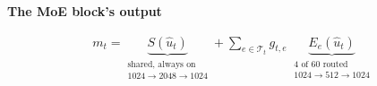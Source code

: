 \documentclass[border=40pt]{standalone}
\begin{document}
\begin{minipage}{26cm}
{\sffamily\bfseries\Large\color{muted} The MoE block's output}\par\vspace{-14pt}
{\LARGE
\begin{gather*}
m_t = \underbrace{S(\hat u_t)}_{\substack{\text{shared, always on}\\ 1024\to2048\to1024}}
+ \sum_{e \in \mathcal{T}_t} g_{t,e}\;\underbrace{E_e(\hat u_t)}_{\substack{\text{4 of 60 routed}\\ 1024\to512\to1024}}
\end{gather*}}
\end{minipage}
\end{document}

